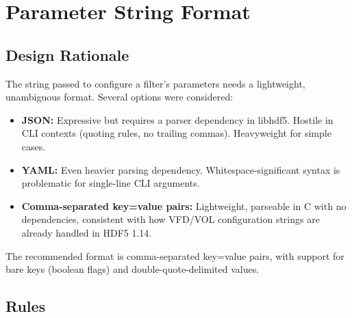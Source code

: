 \documentclass[../HDF5_RFC.tex]{subfiles}
\begin{document}
\section{Parameter String Format}
\label{sec:param-format}

\subsection{Design Rationale}

The string passed to configure a filter's parameters needs a lightweight,
unambiguous format. Several options were considered:

\begin{itemize}
\item \textbf{JSON:} Expressive but requires a parser dependency in libhdf5. Hostile in
  CLI contexts (quoting rules, no trailing commas). Heavyweight for simple
  cases.
\item \textbf{YAML:} Even heavier parsing dependency. Whitespace-significant syntax is
  problematic for single-line CLI arguments.
\item \textbf{Comma-separated key=value pairs:} Lightweight, parseable in C with no
  dependencies, consistent with how VFD/VOL configuration strings are already
  handled in HDF5 1.14.
\end{itemize}

The recommended format is comma-separated key=value pairs, with support for
bare keys (boolean flags) and double-quote-delimited values.

\subsection{Rules}
\label{sec:param-rules}
\end{document}
